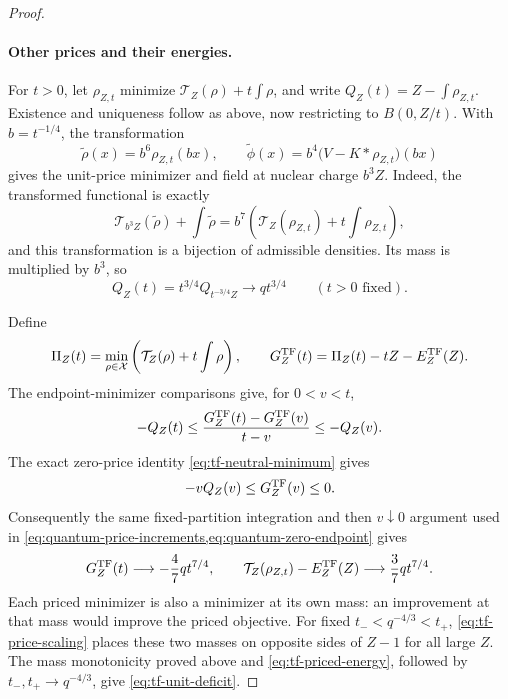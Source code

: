 \begin{proof}
\paragraph{Other prices and their energies.}
For $t>0$, let $\rho_{Z,t}$ minimize
$\mathcal T_Z(\rho)+t\int\rho$, and write
$Q_Z(t)=Z-\int\rho_{Z,t}$.  Existence and uniqueness follow as above,
now restricting to $B(0,Z/t)$.  With $b=t^{-1/4}$, the transformation
\[
 \widetilde\rho(x)=b^6\rho_{Z,t}(bx),\qquad
 \widetilde\phi(x)=b^4\bigl(V-K*\rho_{Z,t}\bigr)(bx)
\]
gives the unit-price minimizer and field at nuclear charge $b^3Z$.
Indeed, the transformed functional is exactly
\[
 \mathcal T_{b^3Z}(\widetilde\rho)+\int\widetilde\rho
       =b^7\left(\mathcal T_Z(\rho_{Z,t})
                                      +t\int\rho_{Z,t}\right),
\]
and this transformation is a bijection of admissible densities.
Its mass is multiplied by $b^3$, so
\begin{equation}\label{eq:tf-price-scaling}
 Q_Z(t)=t^{3/4}Q_{t^{-3/4}Z}
       \longrightarrow qt^{3/4}
       \qquad(t>0\text{ fixed}).
\end{equation}

Define
\[
 \Pi_Z(t)=\min_{\rho\in\mathcal X}
                  \left(\mathcal T_Z(\rho)+t\int\rho\right),\qquad
 G_Z^{\mathrm{TF}}(t)=\Pi_Z(t)-tZ-E_Z^{\mathrm{TF}}(Z).
\]
The endpoint-minimizer comparisons give, for $0<v<t$,
\[
 -Q_Z(t)\le
      \frac{G_Z^{\mathrm{TF}}(t)-G_Z^{\mathrm{TF}}(v)}{t-v}
      \le-Q_Z(v).
\]
The exact zero-price identity \cref{eq:tf-neutral-minimum} gives
\[
 -vQ_Z(v)\le G_Z^{\mathrm{TF}}(v)\le0.
\]
Consequently the same fixed-partition integration and then $v\downarrow0$
argument used in \cref{eq:quantum-price-increments,eq:quantum-zero-endpoint}
gives
\begin{equation}\label{eq:tf-priced-energy}
 G_Z^{\mathrm{TF}}(t)\longrightarrow-\frac47qt^{7/4},\qquad
 \mathcal T_Z(\rho_{Z,t})-E_Z^{\mathrm{TF}}(Z)
       \longrightarrow\frac37qt^{7/4}.
\end{equation}
Each priced minimizer is also a minimizer at its own mass: an improvement
at that mass would improve the priced objective.  For fixed
$t_-<q^{-4/3}<t_+$, \cref{eq:tf-price-scaling} places these two masses on
opposite sides of $Z-1$ for all large $Z$.  The mass monotonicity proved
above and \cref{eq:tf-priced-energy}, followed by
$t_-,t_+\to q^{-4/3}$, give \cref{eq:tf-unit-deficit}.


\end{proof}
